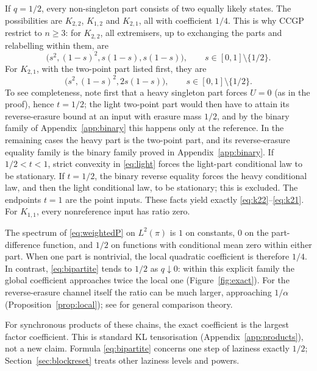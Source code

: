 \documentclass[11pt,a4paper]{article}
\numberwithin{equation}{section}
\theoremstyle{definition}
\theoremstyle{remark}
\begin{document}
If \(q=1/2\), every non-singleton part consists of two equally likely
states. The possibilities are \(K_{2,2}\), \(K_{1,2}\) and \(K_{2,1}\), all
with coefficient \(1/4\). This is why CCGP restrict to \(n\ge3\): for
\(K_{2,2}\), all extremisers, up to exchanging the parts and relabelling
within them, are
\begin{equation}\label{eq:k22}
\big(s^2,(1-s)^2,s(1-s),s(1-s)\big),
\qquad s\in[0,1]\setminus\{1/2\}.
\end{equation}
For \(K_{2,1}\), with the two-point part listed first, they are
\begin{equation}\label{eq:k21}
\big(s^2,(1-s)^2,2s(1-s)\big),
\qquad s\in[0,1]\setminus\{1/2\}.
\end{equation}
To see completeness, note first that a heavy singleton part forces \(U=0\)
(as in the proof), hence \(t=1/2\); the light two-point part would then
have to attain its reverse-erasure bound at an input with erasure mass
\(1/2\), and by the binary family of Appendix~\ref{app:binary} this happens
only at the reference. In the remaining cases the heavy part is the
two-point part, and its reverse-erasure equality family is the binary
family proved in Appendix~\ref{app:binary}. If \(1/2<t<1\), strict convexity
in \eqref{eq:light} forces the light-part conditional law to be stationary.
If \(t=1/2\), the binary reverse equality forces the heavy conditional law,
and then the light conditional law, to be stationary; this is excluded. The
endpoints \(t=1\) are the point inputs. These facts yield exactly
\eqref{eq:k22}--\eqref{eq:k21}. For \(K_{1,1}\), every nonreference input
has ratio zero.

The spectrum of \eqref{eq:weightedP} on \(L^2(\pi)\) is \(1\) on constants,
\(0\) on the part-difference function, and \(1/2\) on functions with
conditional mean zero within either part. When one part is nontrivial, the
local quadratic coefficient is therefore \(1/4\). In contrast,
\eqref{eq:bipartite} tends to \(1/2\) as \(q\downarrow0\): within this
explicit family the global coefficient approaches twice the local one
(Figure~\ref{fig:exact}). For the reverse-erasure channel itself the ratio
can be much larger, approaching \(1/\alpha\)
(Proposition~\ref{prop:local}); see \cite{makur,raginsky} for general
comparison theory.

For synchronous products of these chains, the exact coefficient is the
largest factor coefficient. This is standard KL tensorisation
(Appendix~\ref{app:products}), not a new claim. Formula
\eqref{eq:bipartite} concerns one step of laziness exactly \(1/2\);
Section~\ref{sec:blockreset} treats other laziness levels and powers.
\end{document}
